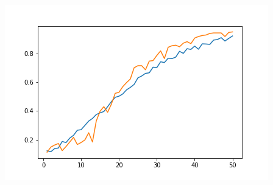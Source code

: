 \documentclass{article}
\begin{document}
\begin{sloppypar}
\begin{itemize}
\begin{center}
\begin{minipage}[b]{0.45\linewidth}
                    \includegraphics[width = \linewidth]{analysis/optimizer/sgd/sgd.png}
                \end{minipage}
            \end{center}
    \end{itemize}

    
    

\end{sloppypar}
\end{document}
